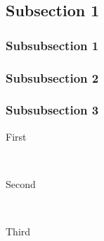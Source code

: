 \documentclass[12pt]{article} %
\begin{document}

\subsection{Subsection 1} %

\subsubsection{Subsubsection 1} %

\lipsum[6] %


\subsubsection{Subsubsection 2} %

\lipsum[6] %
\lipsum[7-8] %


\subsubsection{Subsubsection 3} %

\begin{description} %

\item[First] \hfill \\
\lipsum[9] %

\item[Second] \hfill \\
\lipsum[10] %

\item[Third] \hfill \\
\lipsum[11] %

\end{description} 

\end{document}
